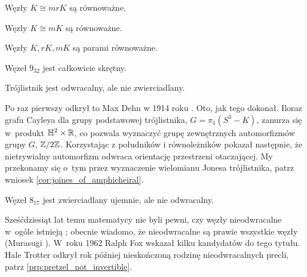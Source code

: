 \begin{definition}
    Węzły $K \cong mrK$ są równoważne. %
\end{definition}

\begin{definition}
    Węzły $K \cong mK$ są równoważne. %
\end{definition}

\begin{definition}
    Węzły $K, rK, mK$ są parami równoważne. %
\end{definition}

\begin{example}
    Węzeł $9_{32}$ jest całkowicie skrętny.
\end{example}


\begin{example}
    \label{exm:trefoil_is_chiral}
    Trójlistnik jest odwracalny, ale nie zwierciadlany.
\end{example}

Po raz pierwszy odkrył to Max Dehn w 1914 roku \cite{dehn14}.
Oto, jak tego dokonał.
Iloraz grafu Cayleya dla grupy podstawowej trójlistnika, $G = \pi_1(S^3 - K)$, zanurza się w~produkt $\mathbb H^2 \times \mathbb R$, co pozwala wyznaczyć grupę zewnętrznych automorfizmów grupy $G$, $\mathbb Z/2\mathbb Z$.
Korzystając z południków i równoleżników pokazał następnie, że nietrywialny automorfizm odwraca orientację przestrzeni otaczającej.
My przekonamy się o~tym przez wyznaczenie wielomianu Jonesa trójlistnika, patrz wniosek \ref{cor:joines_of_amphicheiral}.

\begin{example}
    Węzeł $8_{17}$ jest zwierciadlany ujemnie, ale nie odwracalny.
\end{example}

Sześćdziesiąt lat temu matematycy nie byli pewni, czy węzły nieodwracalne w~ogóle istnieją \cite[problem 10]{fox62};
obecnie wiadomo, że nieodwracalne są prawie wszystkie węzły (Murasugi \cite[s.~46]{murasugi96}).
%
W~roku 1962 Ralph Fox wskazał kilku kandydatów do tego tytułu.
%
Hale Trotter odkrył rok później nieskończoną rodzinę nieodwracalnych precli, patrz \ref{prp:pretzel_not_invertible}.
%

